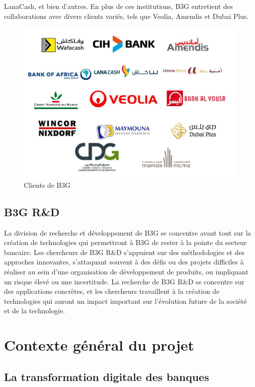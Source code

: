 LanaCash, et bien d'autres. En plus de ces institutions, B3G entretient des collaborations avec divers clients variés, tels que Veolia, Amendis et Dubai Plus.

\begin{figure}[H] 
    \centering
    \includegraphics[width=12cm]{Figures/clients.png}
    \caption{Clients de B3G}
    \label{fig:my_label} %
\end{figure}

\subsection{B3G R\&D}

\hspace{\parindent}La division de recherche et développement de B3G se concentre avant tout sur la création de technologies qui permettront à B3G de rester à la pointe du secteur bancaire. Les chercheurs de B3G R\&D s'appuient sur des méthodologies et des approches innovantes, s'attaquant souvent à des défis ou des projets difficiles à réaliser au sein d'une organisation de développement de produits, ou impliquant un risque élevé ou une incertitude. La recherche de B3G R\&D se concentre sur des applications concrètes, et les chercheurs travaillent à la création de technologies qui auront un impact important sur l'évolution future de la société et de la technologie.

\section{Contexte général du projet}
\subsection{La transformation digitale des banques}

